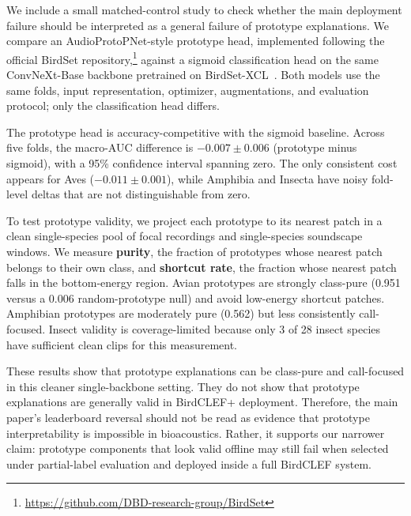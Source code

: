 \documentclass{ceurart}
\begin{document}
We include a small matched-control study to check whether the main deployment failure should be interpreted as a general failure of prototype explanations. We compare an AudioProtoPNet-style prototype head, implemented following the official BirdSet repository,\footnote{\url{https://github.com/DBD-research-group/BirdSet}} against a sigmoid classification head on the same ConvNeXt-Base backbone pretrained on BirdSet-XCL~\cite{liu2022convnext,rauch2024birdset}. Both models use the same folds, input representation, optimizer, augmentations, and evaluation protocol; only the classification head differs.

The prototype head is accuracy-competitive with the sigmoid baseline. Across five folds, the macro-AUC difference is $-0.007 \pm 0.006$ (prototype minus sigmoid), with a 95\% confidence interval spanning zero. The only consistent cost appears for Aves ($-0.011 \pm 0.001$), while Amphibia and Insecta have noisy fold-level deltas that are not distinguishable from zero.

To test prototype validity, we project each prototype to its nearest patch in a clean single-species pool of focal recordings and single-species soundscape windows. We measure \textbf{purity}, the fraction of prototypes whose nearest patch belongs to their own class, and \textbf{shortcut rate}, the fraction whose nearest patch falls in the bottom-energy region. Avian prototypes are strongly class-pure (0.951 versus a 0.006 random-prototype null) and avoid low-energy shortcut patches. Amphibian prototypes are moderately pure (0.562) but less consistently call-focused. Insect validity is coverage-limited because only 3 of 28 insect species have sufficient clean clips for this measurement.

These results show that prototype explanations can be class-pure and call-focused in this cleaner single-backbone setting. They do not show that prototype explanations are generally valid in BirdCLEF+ deployment. Therefore, the main paper's leaderboard reversal should not be read as evidence that prototype interpretability is impossible in bioacoustics. Rather, it supports our narrower claim: prototype components that look valid offline may still fail when selected under partial-label evaluation and deployed inside a full BirdCLEF system.
\end{document}
